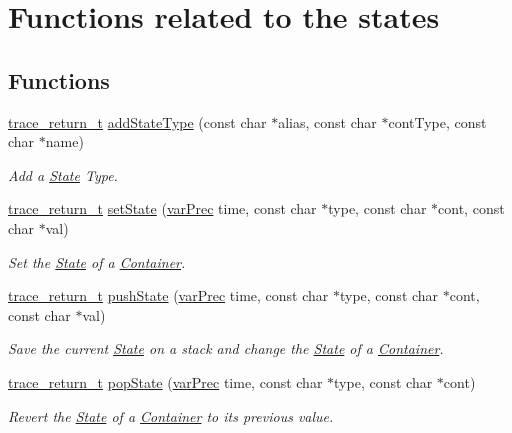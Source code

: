 \hypertarget{group__statef}{\section{Functions related to the states}
\label{group__statef}
}
\subsection*{Functions}
\begin{DoxyCompactItemize}
\item 
\hyperlink{group__type_ga1f1b68fb37d7331f03a48ef0993a0788}{trace\-\_\-return\-\_\-t} \hyperlink{group__statef_gad5c4b3bad6aa9c83a9e8562664fe626a}{add\-State\-Type} (const char $\ast$alias, const char $\ast$cont\-Type, const char $\ast$name)
\begin{DoxyCompactList}\small\item\em Add a \hyperlink{structState}{State} Type. \end{DoxyCompactList}\item 
\hyperlink{group__type_ga1f1b68fb37d7331f03a48ef0993a0788}{trace\-\_\-return\-\_\-t} \hyperlink{group__statef_ga7d0ee8cd70600ebfe5173c6385f6f35f}{set\-State} (\hyperlink{group__type_gabda13d5bcd0cbdb094d655181a857e25}{var\-Prec} time, const char $\ast$type, const char $\ast$cont, const char $\ast$val)
\begin{DoxyCompactList}\small\item\em Set the \hyperlink{structState}{State} of a \hyperlink{structContainer}{Container}. \end{DoxyCompactList}\item 
\hyperlink{group__type_ga1f1b68fb37d7331f03a48ef0993a0788}{trace\-\_\-return\-\_\-t} \hyperlink{group__statef_ga4ecba7c24b51e26839795ae837339af0}{push\-State} (\hyperlink{group__type_gabda13d5bcd0cbdb094d655181a857e25}{var\-Prec} time, const char $\ast$type, const char $\ast$cont, const char $\ast$val)
\begin{DoxyCompactList}\small\item\em Save the current \hyperlink{structState}{State} on a stack and change the \hyperlink{structState}{State} of a \hyperlink{structContainer}{Container}. \end{DoxyCompactList}\item 
\hyperlink{group__type_ga1f1b68fb37d7331f03a48ef0993a0788}{trace\-\_\-return\-\_\-t} \hyperlink{group__statef_ga303c63c84b39511c9cf9d27c2dbea79e}{pop\-State} (\hyperlink{group__type_gabda13d5bcd0cbdb094d655181a857e25}{var\-Prec} time, const char $\ast$type, const char $\ast$cont)
\begin{DoxyCompactList}\small\item\em Revert the \hyperlink{structState}{State} of a \hyperlink{structContainer}{Container} to its previous value. \end{DoxyCompactList}\end{DoxyCompactItemize}


